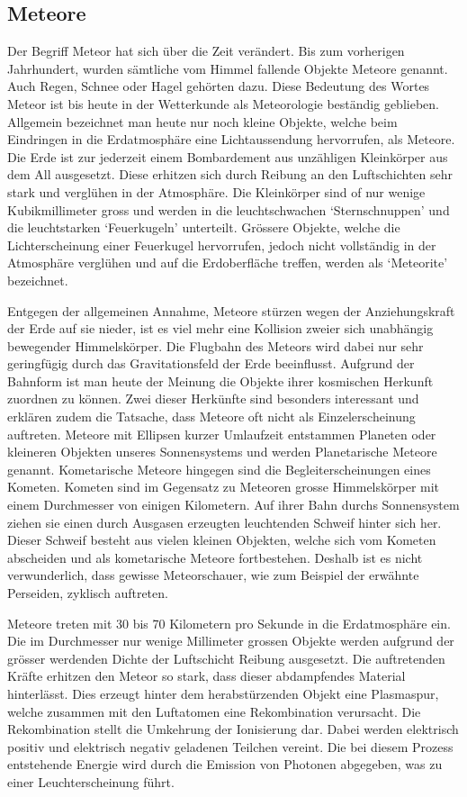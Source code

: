 \begin{refsection}
\section{Meteore}

Der Begriff Meteor hat sich über die Zeit verändert. 
Bis zum vorherigen Jahrhundert, wurden sämtliche vom Himmel fallende Objekte Meteore genannt. 
Auch Regen, Schnee oder Hagel gehörten dazu. 
Diese Bedeutung des Wortes Meteor ist bis heute in der Wetterkunde als Meteorologie beständig geblieben.
Allgemein bezeichnet man heute nur noch kleine Objekte, welche beim Eindringen in die Erdatmosphäre eine Lichtaussendung hervorrufen, als Meteore.  
Die Erde ist zur jederzeit einem Bombardement aus unzähligen Kleinkörper aus dem All ausgesetzt. 
Diese erhitzen sich durch Reibung an den Luftschichten sehr stark und verglühen in der Atmosphäre. 
Die Kleinkörper sind of nur wenige Kubikmillimeter gross und werden in die leuchtschwachen `Sternschnuppen' und die leuchtstarken `Feuerkugeln' unterteilt.
Grössere Objekte, welche die Lichterscheinung einer Feuerkugel hervorrufen, jedoch nicht vollständig in der Atmosphäre verglühen und auf die Erdoberfläche treffen, werden als `Meteorite' bezeichnet.

Entgegen der allgemeinen Annahme, Meteore stürzen wegen der Anziehungskraft der Erde auf sie nieder, ist es viel mehr eine Kollision zweier sich unabhängig bewegender Himmelskörper. 
Die Flugbahn des Meteors wird dabei nur sehr geringfügig durch das Gravitationsfeld der Erde beeinflusst.
Aufgrund der Bahnform ist man heute der Meinung die Objekte ihrer kosmischen Herkunft zuordnen zu können. 
Zwei dieser Herkünfte sind besonders interessant und erklären zudem die Tatsache, dass Meteore oft nicht als Einzelerscheinung auftreten. 
Meteore mit Ellipsen kurzer Umlaufzeit entstammen Planeten oder kleineren Objekten unseres Sonnensystems und werden Planetarische Meteore genannt.
Kometarische Meteore hingegen sind die Begleiterscheinungen eines Kometen. 
Kometen sind im Gegensatz zu Meteoren grosse Himmelskörper mit einem Durchmesser von einigen Kilometern.
Auf ihrer Bahn durchs Sonnensystem ziehen sie einen durch Ausgasen erzeugten leuchtenden Schweif hinter sich her.
Dieser Schweif besteht aus vielen kleinen Objekten, welche sich vom Kometen abscheiden und als kometarische Meteore fortbestehen.
Deshalb ist es nicht verwunderlich, dass gewisse Meteorschauer, wie zum Beispiel der erwähnte Perseiden, zyklisch auftreten.\cite{lexikon:meyer}

Meteore treten mit 30 bis 70 Kilometern pro Sekunde in die Erdatmosphäre ein. 
Die im Durchmesser nur wenige Millimeter grossen Objekte werden aufgrund der grösser werdenden Dichte der Luftschicht Reibung ausgesetzt.
Die auftretenden Kräfte erhitzen den Meteor so stark, dass dieser abdampfendes Material hinterlässt.
Dies erzeugt hinter dem herabstürzenden Objekt eine Plasmaspur, welche zusammen mit den Luftatomen eine Rekombination verursacht.
Die Rekombination stellt die Umkehrung der Ionisierung dar. 
Dabei werden elektrisch positiv und elektrisch negativ geladenen Teilchen vereint.
Die bei diesem Prozess entstehende Energie wird durch die Emission von Photonen abgegeben, was zu einer Leuchterscheinung führt.\cite{web:brodbeck}


\end{refsection}
